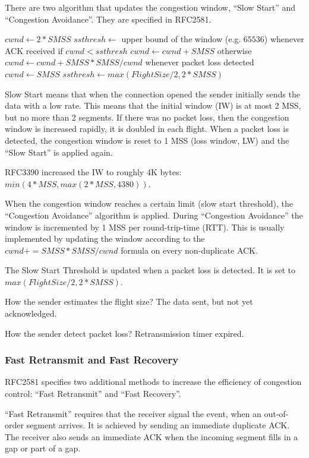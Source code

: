 There are two algorithm that updates the congestion window, ``Slow Start''
and ``Congestion Avoidance''. They are specified in RFC2581.

\begin{pseudocode}
$cwnd \gets 2*SMSS$
$ssthresh \gets $ upper bound of the window (e.g. $65536$)
whenever ACK received
  if $cwnd < ssthresh$
    $cwnd \gets cwnd + SMSS$
  otherwise
    $cwnd \gets cwnd + SMSS*SMSS/cwnd$
whenever packet loss detected
  $cwnd \gets SMSS$
  $ssthresh \gets max(FlightSize/2, 2*SMSS)$
\end{pseudocode}

Slow Start means that when the connection opened the sender initially
sends the data with a low rate. This means that the initial
window (IW) is at most 2 MSS, but no more than 2 segments. If there was no packet loss,
then the congestion window is increased rapidly, it is doubled in each flight.
When a packet loss is detected, the congestion window is reset to 1 MSS (loss window, LW)
and the ``Slow Start'' is applied again.

\begin{note}
RFC3390 increased the IW to roughly 4K bytes: $min(4*MSS, max(2*MSS, 4380))$.
\end{note}

When the congestion window reaches a certain limit (slow start threshold),
the ``Congestion Avoidance'' algorithm is applied. During ``Congestion Avoidance''
the window is incremented by 1 MSS per round-trip-time (RTT). This is usually
implemented by updating the window according to the $ cwnd += SMSS*SMSS/cwnd $
formula on every non-duplicate ACK.

The Slow Start Threshold is updated when a packet loss is detected.
It is set to $max(FlightSize/2, 2*SMSS)$.

How the sender estimates the flight size? The data sent, but not yet acknowledged.

How the sender detect packet loss? Retransmission timer expired.


\subsubsection*{Fast Retransmit and Fast Recovery}

RFC2581 specifies two additional methods to increase the efficiency
of congestion control: ``Fast Retransmit'' and ``Fast Recovery''.

``Fast Retransmit'' requires that the receiver signal the event,
when an out-of-order segment arrives. It is achieved by sending
an immediate duplicate ACK. The receiver also sends an immediate
ACK when the incoming segment fills in a gap or part of a gap.

